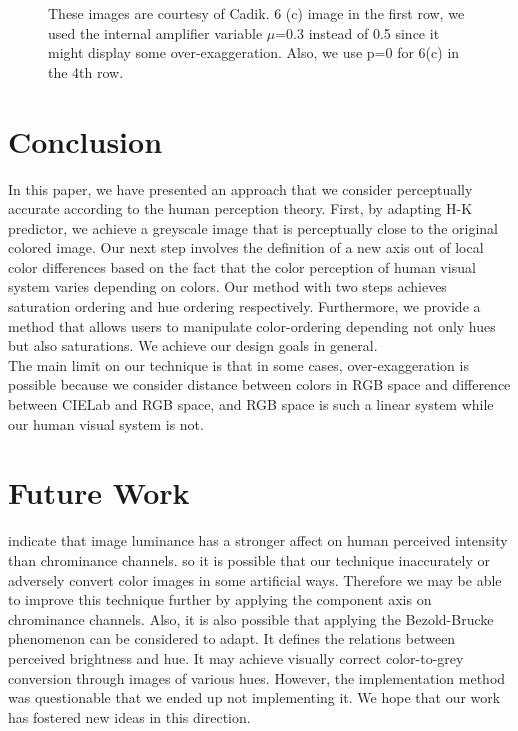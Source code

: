 \documentclass{article}
\begin{document}
\begin{figure}[b]
\begin{center}
  \end{center}
  \caption{These images are courtesy of Cadik. 6 (c) image in the first row, we used the internal amplifier variable $\mu$=0.3 instead of 0.5 since it might display some over-exaggeration. Also, we use p=0 for 6(c) in the 4th row.}
  \label{fig:resultcomparison}
\end{figure}


\section{Conclusion}
 In this paper, we have presented an approach that we consider perceptually accurate according to the human perception theory. First, by adapting H-K predictor, we achieve a greyscale image that is perceptually close to the original colored image. Our next step involves the definition of a new axis out of local color differences based on the fact that the color perception of human visual system varies depending on colors. Our method with two steps achieves saturation ordering and hue ordering respectively. Furthermore, we provide a method that allows users to manipulate color-ordering depending not only hues but also saturations. We achieve our design goals in general.\\
 The main limit on our technique is that in some cases, over-exaggeration is possible because we consider distance between colors in RGB space and difference between CIELab and RGB space, and RGB space is such a linear system while our human visual system is not.

\section{Future Work}
 \cite{Fairchild2004_1} indicate that image luminance has a stronger affect on human perceived intensity than chrominance channels. so it is possible that our technique inaccurately or adversely convert color images in some artificial ways. Therefore we may be able to improve this technique further by applying the component axis on chrominance channels. Also, it is also possible that applying the Bezold-Brucke phenomenon can be considered to adapt. It defines the relations between perceived brightness and hue. It may achieve visually correct color-to-grey conversion through images of various hues. However, the implementation method was questionable that we ended up not implementing it. We hope that our work has fostered new ideas in this direction.
\end{document}
